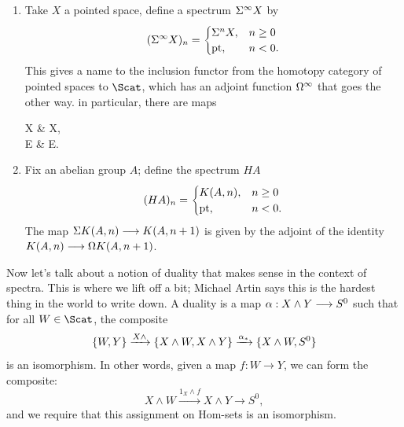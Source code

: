 \begin{enumerate}
\item Take $X$ a pointed space, define a spectrum $\Sigma^\infty X$ by \[(\Sigma^\infty X)_n =\begin{cases} \Sigma^n X,&n\geq0\\\mathrm{pt},&n<0.\end{cases}\]
This gives a name to the inclusion functor from the homotopy category of pointed spaces to $\Scat$, which has an adjoint function $\Omega^\infty$ that goes the other way.  in particular, there are maps
\begin{ctikzcd}
X \rar{\alpha} & \LoopsS \SuspendS X, \\
E & \lar["\beta"'] \SuspendS \LoopsS E.
\end{ctikzcd}
\item Fix an abelian group $A$; define the spectrum $HA$
\[(HA)_n =\begin{cases} K(A,n),&n\geq0\\\mathrm{pt},&n<0.\end{cases}\]
The map $\Sigma K(A, n) \longrightarrow K(A, n+1)$ is given by the adjoint of the identity $K(A, n) \longrightarrow \Omega K(A, n+1)$.
\end{enumerate}

Now let's talk about a notion of duality that makes sense in the context of spectra.  This is where we lift off a bit; Michael Artin says this is the hardest thing in the world to write down.  A duality is a map $\alpha: X \wedge Y \longrightarrow S^0$ such that for all $W \in \Scat$, the composite \[\{W, Y\} \xrightarrow{X \wedge} \{X \wedge W, X \wedge Y\} \xrightarrow{\alpha_*} \{X \wedge W, S^0\}\] is an isomorphism. In other words, given a map $f: W \to Y$, we can form the composite:
\[X\wedge W \xrightarrow{1_X \wedge f} X\wedge Y\to S^0,\]
and we require that this assignment on Hom-sets is an isomorphism.

